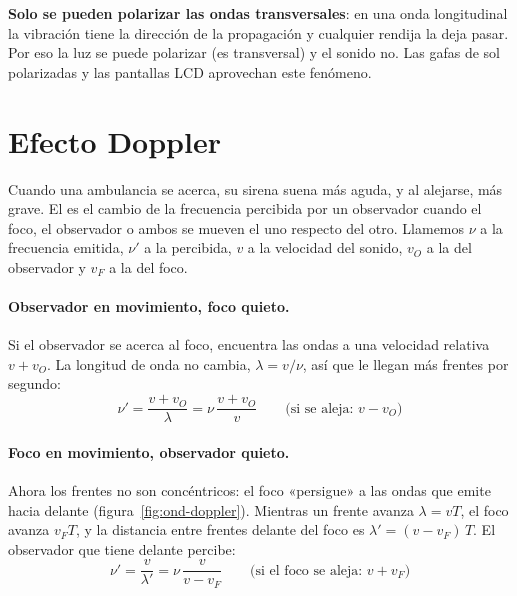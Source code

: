 \begin{remark}
    \textbf{Solo se pueden polarizar las ondas transversales}: en una onda longitudinal la vibración tiene la dirección de
    la propagación y cualquier rendija la deja pasar. Por eso la luz se puede polarizar (es transversal) y el sonido no.
    Las gafas de sol polarizadas y las pantallas LCD aprovechan este fenómeno.
\end{remark}

\section{Efecto Doppler}\label{sec:ond-doppler}

Cuando una ambulancia se acerca, su sirena suena más aguda, y al alejarse, más grave. El  es el
cambio de la frecuencia percibida por un observador cuando el foco, el observador o ambos se mueven el uno respecto del
otro. Llamemos \(\nu\) a la frecuencia emitida, \(\nu'\) a la percibida, \(v\) a la velocidad del sonido,
\(v_O\) a la del observador y \(v_F\) a la del foco.

\paragraph{Observador en movimiento, foco quieto.} Si el observador se acerca al foco, encuentra las ondas a una velocidad
relativa \(v + v_O\). La longitud de onda no cambia, \(\lambda = v/\nu\), así que le llegan más frentes por segundo:
\begin{equation*}
    \nu' = \dfrac{v + v_O}{\lambda} = \nu\,\dfrac{v + v_O}{v} \qquad \text{(si se aleja: } v - v_O\text{)}
\end{equation*}

\paragraph{Foco en movimiento, observador quieto.} Ahora los frentes no son concéntricos: el foco «persigue» a las ondas
que emite hacia delante (figura~\ref{fig:ond-doppler}). Mientras un frente avanza \(\lambda = vT\), el foco avanza
\(v_F T\), y la distancia entre frentes delante del foco es \(\lambda' = (v - v_F)\,T\). El observador que tiene delante
percibe:
\begin{equation*}
    \nu' = \dfrac{v}{\lambda'} = \nu\,\dfrac{v}{v - v_F} \qquad \text{(si el foco se aleja: } v + v_F\text{)}
\end{equation*}

